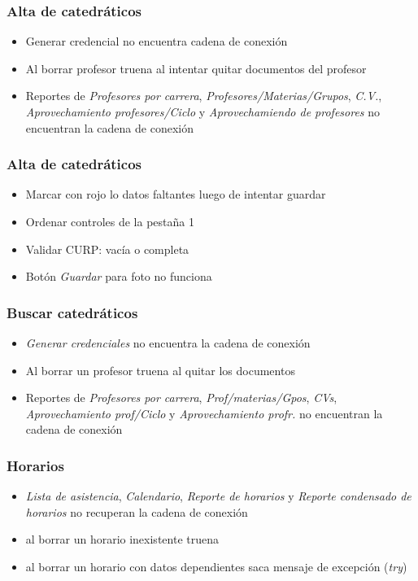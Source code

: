 \documentclass[12pt,spanish,twocolumn]{article}
\begin{document}
\subsubsection{Alta de catedr\'aticos}
\begin{itemize}
\item Generar credencial no encuentra cadena de conexi\'on
\item Al borrar profesor truena al intentar quitar documentos del profesor
\item Reportes de \emph{Profesores por carrera}, \emph{Profesores/Materias/Grupos}, \emph{C.V.}, \emph{Aprovechamiento profesores/Ciclo} y \emph{Aprovechamiendo de profesores} no encuentran la cadena de conexi\'on
\end{itemize}

\subsubsection{Alta de catedr\'aticos}
\begin{itemize}
\item Marcar con rojo lo datos faltantes luego de intentar guardar
\item Ordenar controles de la pesta\~na 1
\item Validar CURP: vac\'ia o completa
\item Bot\'on \emph{Guardar} para foto no funciona
\end{itemize}

\subsubsection{Buscar catedr\'aticos}
\begin{itemize}
\item \emph{Generar credenciales} no encuentra la cadena de conexi\'on
\item Al borrar un profesor truena al quitar los documentos
\item Reportes de \emph{Profesores por carrera}, \emph{Prof/materias/Gpos}, \emph{CVs}, \emph{Aprovechamiento prof/Ciclo} y \emph{Aprovechamiento profr.} no encuentran la cadena de conexi\'on 
\end{itemize}

\subsubsection{Horarios}
\begin{itemize}
\item \emph{Lista de asistencia}, \emph{Calendario}, \emph{Reporte de horarios} y \emph{Reporte condensado de horarios} no recuperan la cadena de conexi\'on
\item al borrar un horario inexistente truena
\item al borrar un horario con datos dependientes saca mensaje de excepci\'on (\emph{try})
\end{itemize}
\end{document}
